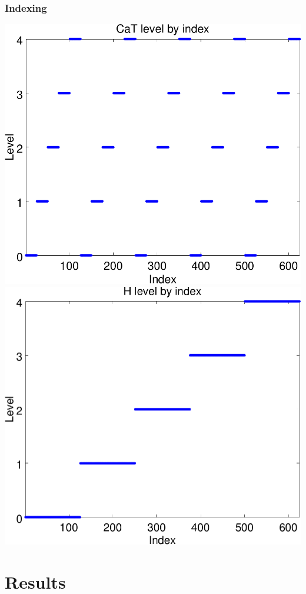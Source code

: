 \documentclass{beamer}
\theoremstyle{plain}
\theoremstyle{definition}
\begin{document}
\begin{frame}\frametitle{Indexing}
  \begin{center}
    \includegraphics[scale=.32]{CaTfrequency.pdf}%
    \includegraphics[scale=.32]{Hfrequency.pdf}
  \end{center}
\end{frame}

\section{Results}
\end{document}

